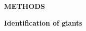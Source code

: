 \documentclass{natureprintstyle}
\begin{document}

\newpage

\setcounter{page}{1}
\setcounter{figure}{0}
\setcounter{table}{0}
\captionsetup[figure]{labelformat=empty}
\renewcommand{\thefigure}{Extended Data \arabic{figure}}
\renewcommand{\thetable}{Extended Data \arabic{table}}

\begin{center}
{\bf \Large \uppercase{Methods}}
\end{center}

\noindent
{\bf Identification of giants}
\end{document}
